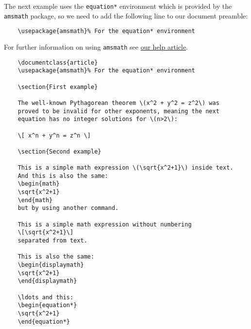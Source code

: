 The next example uses the \verb|equation*| environment which is provided by the \verb|amsmath| package, so we need to add the following line to our document preamble:

\begin{tcolorbox}
\begin{verbatim}
    \usepackage{amsmath}% For the equation* environment
\end{verbatim}
\end{tcolorbox}

For further information on using \verb|amsmath| see \href{https://www.overleaf.com/learn/latex/Aligning_equations}{our help article}.

\begin{tcolorbox}
\begin{verbatim}
    \documentclass{article}
    \usepackage{amsmath}% For the equation* environment
    
    \section{First example}

    The well-known Pythagorean theorem \(x^2 + y^2 = z^2\) was 
    proved to be invalid for other exponents, meaning the next
    equation has no integer solutions for \(n>2\):

    \[ x^n + y^n = z^n \]

    \section{Second example}

    This is a simple math expression \(\sqrt{x^2+1}\) inside text. 
    And this is also the same: 
    \begin{math}
    \sqrt{x^2+1}
    \end{math}
    but by using another command.

    This is a simple math expression without numbering
    \[\sqrt{x^2+1}\] 
    separated from text.

    This is also the same:
    \begin{displaymath}
    \sqrt{x^2+1}
    \end{displaymath}

    \ldots and this:
    \begin{equation*}
    \sqrt{x^2+1}
    \end{equation*}
    
\end{verbatim}
\end{tcolorbox}

